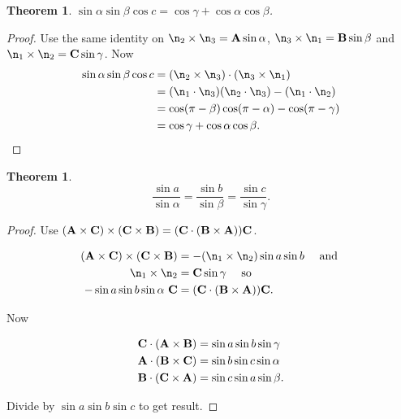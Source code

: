 \documentclass{notes}
\theoremstyle{plain}
\newtheorem{theorem}[proposition]{Theorem}
\begin{document}
\begin{theorem}
$\sin \alpha \sin \beta \cos c = \cos \gamma + \cos \alpha \cos \beta$. 
\end{theorem}

\begin{proof}
Use the same identity on $\n_2 \times \n_3 = \vect{A} \sin \alpha$,
$\n_3 \times \n_1 = \vect{B} \sin \beta$ and
$\n_1 \times \n_2 = \vect{C} \sin \gamma$.  Now
\begin{align*}
\sin \alpha \sin \beta \cos c &=
(\n_2 \times \n_3) \cdot (\n_3 \times \n_1) \\
&= (\n_1 \cdot \n_3)(\n_2 \cdot \n_3) - (\n_1 \cdot \n_2)\\
&= \cos(\pi - \beta)\cos(\pi - \alpha) - \cos(\pi - \gamma) \\
&= \cos \gamma + \cos \alpha \cos \beta.
\end{align*}

\end{proof}

\begin{theorem}
\[
\frac{\sin a}{\sin \alpha} = \frac{\sin b}{\sin \beta} = 
\frac{\sin c}{\sin \gamma}.
\]
\end{theorem}

\begin{proof}
Use $(\mathbf{A} \times \mathbf{C}) \times (\mathbf{C} \times \mathbf{B})
= (\mathbf{C} \cdot (\mathbf{B} \times \mathbf{A})) \mathbf{C}$.

\begin{align*}
(\vect{A} \times \vect{C}) \times (\vect{C} \times \vect{B})
&= -(\n_1 \times \n_2) \sin a \sin b \quad \text{ and } \\
\n_1 \times \n_2 & = \vect{C} \sin \gamma \quad \text{ so } \\
- \sin a \sin b \sin \alpha\ \vect{C} &= (\vect{C} \cdot (\vect{B} \times \vect{A}))
\vect{C}.
\end{align*}

Now

\begin{align*}
\mathbf{C}\cdot(\mathbf{A} \times \mathbf{B}) & = \sin a \sin b \sin \gamma \\
\mathbf{A}\cdot(\mathbf{B} \times \mathbf{C}) & = \sin b \sin c \sin \alpha \\
\mathbf{B}\cdot(\mathbf{C} \times \mathbf{A}) & = \sin c \sin a \sin \beta.
\end{align*}

Divide by $\sin a \sin b \sin c$ to get result.
\end{proof}
\end{document}
